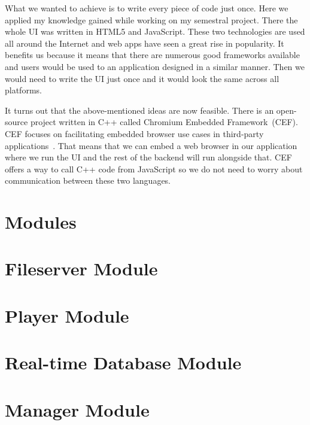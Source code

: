 \par
What we wanted to achieve is to write every piece of code just once. Here we applied my knowledge gained while working on my semestral project. There the whole UI was written in HTML5 and JavaScript. These two technologies are used all around the Internet and web apps have seen a great rise in popularity. It benefits us because it means that there are numerous good frameworks available and users would be used to an application designed in a similar manner. Then we would need to write the UI just once and it would look the same across all platforms.
\par
It turns out that the above-mentioned ideas are now feasible. There is an open-source project written in C++ called Chromium Embedded Framework~(CEF). CEF focuses on facilitating embedded browser use cases in third-party applications~\citep{cef}. That means that we can embed a web browser in our application where we run the UI and the rest of the backend will run alongside that. CEF offers a way to call C++ code from JavaScript so we do not need to worry about communication between these two languages.


\section{Modules}

\section {Fileserver Module}

\section {Player Module}

\section {Real-time Database Module}

\section {Manager Module}
